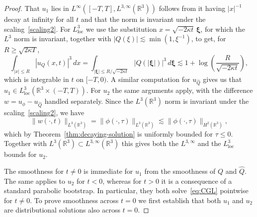 \documentclass[11pt]{article}
\begin{document}
\begin{proof}
  That \(u_{1}\) lies in
  \(L^{\infty}([-T, T], L^{3,\infty}(\mathbb{R}^{3}))\) follows from
  it having \(|x|^{-1}\) decay at infinity for all \(t\) and that the
  norm is invariant under the scaling~\eqref{scaling2}. For
  \(L_{\text{loc}}^{3}\) we use the substitution
  \(x = \sqrt{-2\kappa t}\,\bm{\xi}\), for which the \(L^{3}\) norm is
  invariant, together with \(|Q(\xi)| \lesssim \min(1, \xi^{-1})\), to
  get, for \(R \geq \sqrt{2\kappa T}\),
  \begin{equation*}
    \int_{|x| \leq R} |u_{Q}(x, t)|^{3}\,dx
    = \int_{|\bm{\xi}| \leq R / \sqrt{-2\kappa t}} |Q(|\bm{\xi}|)|^{3}\,d\bm{\xi}
    \lesssim 1 + \log\left(\frac{R}{\sqrt{-2\kappa t}}\right),
  \end{equation*}
  which is integrable in \(t\) on \([-T, 0)\). A similar computation
  for \(u_{\hat{Q}}\) gives us that
  \(u_{1} \in L_{\text{loc}}^{3}(\mathbb{R}^{3} \times (-T, T))\). For
  \(u_{2}\) the same arguments apply, with the difference
  \(w = u_{\phi} - u_{\hat{Q}}\) handled separately. Since the
  \(L^{3}(\mathbb{R}^{3})\) norm is invariant under the
  scaling~\eqref{scaling2}, we have
  \begin{equation*}
    \|w(\cdot, t)\|_{L^{3}(\mathbb{R}^{3})}
    = \|\phi(\cdot, \tau)\|_{L^{3}(\mathbb{R}^{3})}
    \lesssim \|\phi(\cdot, \tau)\|_{H^{2}(\mathbb{R}^{3})},
  \end{equation*}
  which by Theorem~\ref{thm:decaying-solution} is uniformly bounded
  for \(\tau \leq 0\). Together with
  \(L^{3}(\mathbb{R}^{3}) \subset L^{3,\infty}(\mathbb{R}^{3})\) this
  gives both the \(L^{3,\infty}\) and the \(L_{\text{loc}}^{3}\)
  bounds for \(u_{2}\).

  The smoothness for \(t \neq 0\) is immediate for \(u_{1}\) from the
  smoothness of \(Q\) and \(\hat{Q}\). The same applies to \(u_{2}\)
  for \(t < 0\), whereas for \(t > 0\) it is a consequence of a
  standard parabolic bootstrap. In particular, they both
  solve~\eqref{eq:CGL} pointwise for \(t \neq 0\). To prove smoothness
  across \(t = 0\) we first establish that both \(u_{1}\) and
  \(u_{2}\) are distributional solutions also across \(t = 0\).


\end{proof}
\end{document}
